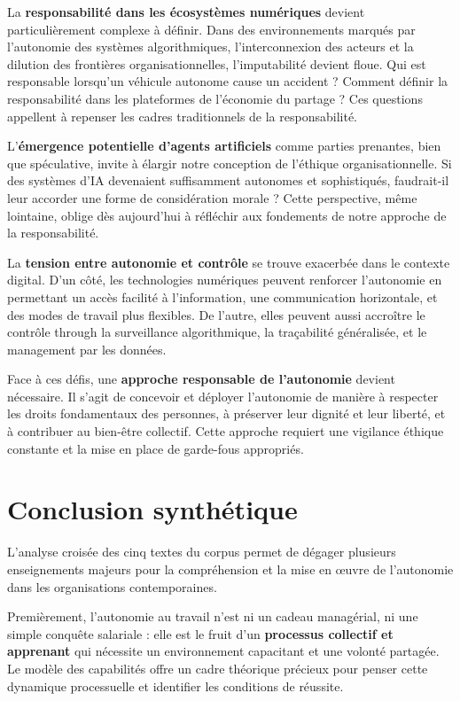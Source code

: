 \documentclass{rapportECL}
\begin{document}
La \textbf{responsabilité dans les écosystèmes numériques} devient particulièrement complexe à définir. Dans des environnements marqués par l'autonomie des systèmes algorithmiques, l'interconnexion des acteurs et la dilution des frontières organisationnelles, l'imputabilité devient floue. Qui est responsable lorsqu'un véhicule autonome cause un accident ? Comment définir la responsabilité dans les plateformes de l'économie du partage ? Ces questions appellent à repenser les cadres traditionnels de la responsabilité.

L'\textbf{émergence potentielle d'agents artificiels} comme parties prenantes, bien que spéculative, invite à élargir notre conception de l'éthique organisationnelle. Si des systèmes d'IA devenaient suffisamment autonomes et sophistiqués, faudrait-il leur accorder une forme de considération morale ? Cette perspective, même lointaine, oblige dès aujourd'hui à réfléchir aux fondements de notre approche de la responsabilité.

\newpage

La \textbf{tension entre autonomie et contrôle} se trouve exacerbée dans le contexte digital. D'un côté, les technologies numériques peuvent renforcer l'autonomie en permettant un accès facilité à l'information, une communication horizontale, et des modes de travail plus flexibles. De l'autre, elles peuvent aussi accroître le contrôle through la surveillance algorithmique, la traçabilité généralisée, et le management par les données.

Face à ces défis, une \textbf{approche responsable de l'autonomie} devient nécessaire. Il s'agit de concevoir et déployer l'autonomie de manière à respecter les droits fondamentaux des personnes, à préserver leur dignité et leur liberté, et à contribuer au bien-être collectif. Cette approche requiert une vigilance éthique constante et la mise en place de garde-fous appropriés.

\section*{Conclusion synthétique}

L'analyse croisée des cinq textes du corpus permet de dégager plusieurs enseignements majeurs pour la compréhension et la mise en œuvre de l'autonomie dans les organisations contemporaines.

Premièrement, l'autonomie au travail n'est ni un cadeau managérial, ni une simple conquête salariale : elle est le fruit d'un \textbf{processus collectif et apprenant} qui nécessite un environnement capacitant et une volonté partagée. Le modèle des capabilités offre un cadre théorique précieux pour penser cette dynamique processuelle et identifier les conditions de réussite.
\end{document}
